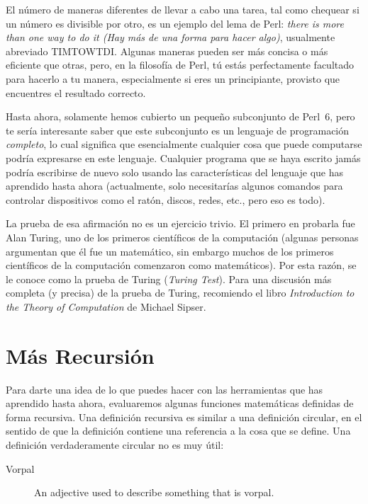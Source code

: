 El número de maneras diferentes de llevar a cabo una tarea,
tal como chequear si un número es divisible por otro,
es un ejemplo del lema de Perl:
\emph{there is more than one way to do it 
(Hay más de una forma para hacer algo)}, usualmente abreviado TIMTOWTDI.
Algunas maneras pueden ser más concisa o más eficiente que
otras, pero, en la filosofía de Perl, tú estás perfectamente 
facultado para hacerlo a tu manera, especialmente si eres
un principiante, provisto que encuentres el resultado 
correcto.

Hasta ahora, solamente hemos cubierto un pequeño subconjunto de Perl~6,
pero te sería interesante saber que este subconjunto es un lenguaje
de programación \emph{completo}, lo cual significa que esencialmente
cualquier cosa que puede computarse podría expresarse en este 
lenguaje. Cualquier programa que se haya escrito jamás podría escribirse
de nuevo solo usando las características del lenguaje que has aprendido
hasta ahora (actualmente, solo necesitarías algunos comandos para
controlar dispositivos como el ratón, discos, redes, etc., pero eso 
es todo).

La prueba de esa afirmación no es un ejercicio trivio. El primero
en probarla fue Alan Turing, uno de los primeros científicos de la
computación (algunas personas argumentan que él fue un matemático, sin 
embargo muchos de los primeros científicos de la computación comenzaron 
como matemáticos). Por esta razón, se le conoce como la prueba de Turing
(\emph{Turing Test}). Para una discusión más completa (y precisa) de la
prueba de Turing, recomiendo el libro  {\em Introduction to the
Theory of Computation} de Michael Sipser.

\section{Más Recursión}
\label{more.recursion}


Para darte una idea de lo que puedes hacer con las herramientas
que has aprendido hasta ahora, evaluaremos algunas funciones 
matemáticas definidas de forma recursiva. Una definición recursiva
es similar a una definición circular, en el sentido de que la 
definición contiene una referencia a la cosa que se define. 
Una definición verdaderamente circular no es muy útil:

\begin{description}

\item[Vorpal] An adjective used to describe something that is vorpal.

\end{description}

